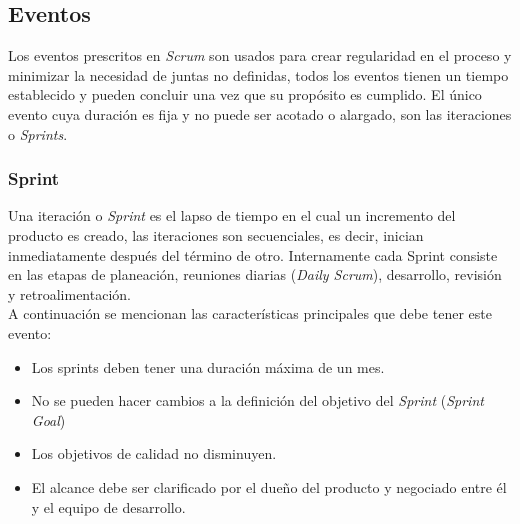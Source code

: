 \begin{quote}
    \end{quote}

\subsection{Eventos}

 Los eventos prescritos en {\it Scrum} son usados para crear regularidad en el proceso y minimizar
 la necesidad de juntas no definidas, todos los eventos tienen un tiempo establecido y pueden
 concluir una vez que su propósito es cumplido. El único evento cuya duración es fija y no puede
 ser acotado o alargado, son las iteraciones o {\it Sprints}.
 
\subsubsection{Sprint}

 Una iteración o {\it Sprint} es el lapso de tiempo en el cual un incremento del producto es 
 creado, las iteraciones son secuenciales, es decir, inician inmediatamente después del término
 de otro. Internamente cada Sprint consiste en las etapas de planeación, reuniones diarias
 ({\it Daily Scrum}), desarrollo, revisión y retroalimentación.\\

 \noindent A continuación se mencionan las características principales que debe tener este evento:

    \begin{itemize}
    \item Los sprints deben tener una duración máxima de un mes.
    \item No se pueden hacer cambios a la definición del objetivo del {\it Sprint}
            ({\it Sprint Goal})
    \item Los objetivos de calidad no disminuyen.
    \item El alcance debe ser clarificado por el dueño del producto y negociado entre él y el equipo
           de desarrollo.
    \end{itemize}


